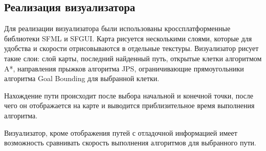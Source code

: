 \subsection{Реализация визуализатора}

Для реализации визуализатора были использованы кроссплатформенные библиотеки SFML и SFGUI. Карта рисуется несколькими слоями, которые для удобства и скорости отрисовываются в отдельные текстуры. Визуализатор рисует такие слои: слой карты, последний найденный путь, открытые клетки алгоритмом A*, направления прыжков алгоритма JPS, ограничивающие прямоугольники алгоритма Goal Bounding для выбранной клетки.

Нахождение пути происходит после выбора начальной и конечной точки, после чего он отображается на карте и выводится приблизительное время выполнения алгоритма. 

Визуализатор, кроме отображения путей с отладочной информацией имеет возможность сравнивать скорость выполнения алгоритмов для выбранного пути.